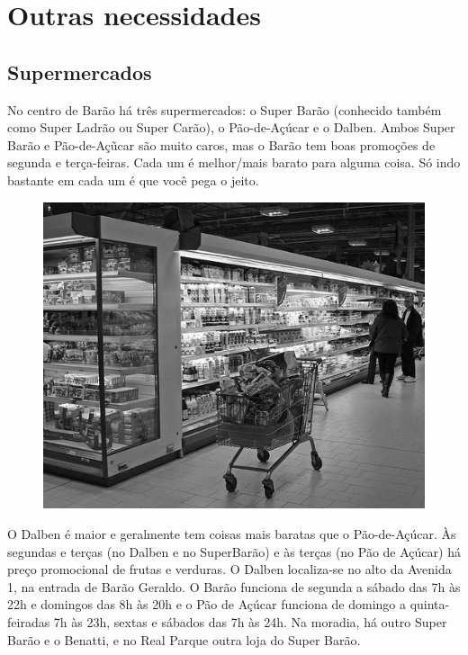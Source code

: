 
\section{Outras necessidades}
\subsection{Supermercados}

No centro de Barão há três supermercados: o Super Barão (conhecido também como
Super Ladrão ou Super Carão), o Pão-de-Açúcar e o Dalben. Ambos Super Barão
e Pão-de-Açũcar são muito caros, mas o Barão tem boas promoções de segunda
e terça-feiras. Cada um é melhor/mais barato para alguma coisa. Só indo bastante
em cada um é que você pega o jeito.
\begin{figure}[h!]
    \centering
    \includegraphics[scale=0.42,keepaspectratio=true]{img/imgs/9-outras_necessidades/supermercado.jpg}
\end{figure}
O Dalben é maior
e geralmente tem coisas mais baratas que o Pão-de-Açúcar. Às segundas e terças
(no Dalben e no SuperBarão) e às terças (no Pão de Açúcar) há preço promocional
de frutas e verduras. O Dalben localiza-se no alto da Avenida 1, na entrada de
Barão Geraldo. O Barão funciona de segunda a sábado das 7h às 22h e domingos das
8h às 20h e o Pão de Açúcar funciona de domingo a quinta-feiradas 7h às 23h,
sextas e sábados das 7h às 24h. Na moradia, há outro Super Barão e o Benatti,
e no Real Parque outra loja do Super Barão.

